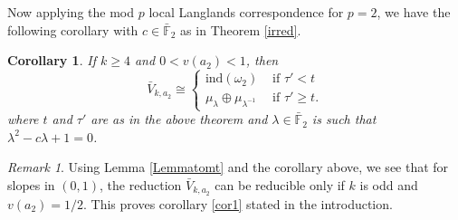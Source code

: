 \documentclass[11pt, reqno]{amsart}
\numberwithin{equation}{section}
\newcommand\ind{\mathrm{ind}}
\newcommand{\F}{\mathbb{F}}
\newtheorem{cor}[thm]{Corollary}
\theoremstyle{definition}
\theoremstyle{remark}
\newtheorem{remark}[thm]{Remark}
\theoremstyle{definition}
\theoremstyle{remark}
\theoremstyle{remark}
\begin{document}
Now applying the mod $p$ local Langlands correspondence for $p=2$, we have the following corollary with $c \in \bar{\F}_{2}$ as in Theorem \ref{irred}.
\begin{cor}
   If $k \geq 4$ and $0<v(a_{2})<1$, then $$\bar{V}_{k,a_2} \cong\begin{cases}
\ind(\omega_{2}) &\text{ if } \tau'<t\\
\mu_{\lambda} \oplus \mu_{\lambda^{-1}} &\text{ if } \tau'\geq t.
\end{cases}$$ where $t$ and $\tau'$ are as in the above theorem and $\lambda \in \bar{\F}_{2}$ is such that  $\lambda^{2}-c\lambda +1=0$. 
\end{cor}

\begin{remark}
Using Lemma \ref{Lemmatomt} and the corollary above, we see that for slopes in $(0,1)$, the reduction $\bar V_{k,a_2}$ can be reducible only if $k$ is odd and $v(a_2)=1/2$. This proves corollary \ref{cor1} stated in the introduction.
\end{remark}
\end{document}
